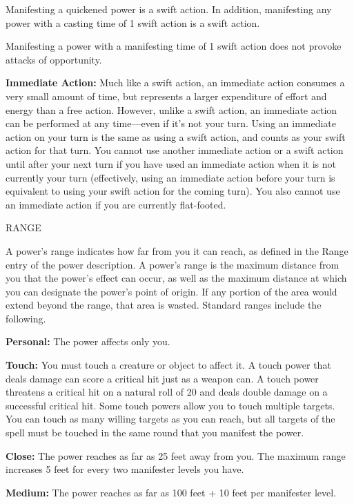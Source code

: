 \documentclass{article}
\begin{document}
Manifesting a quickened power is a swift action. In addition, manifesting any power 
with a casting time of 1 swift action is a swift action.

Manifesting a power with a manifesting time of 1 swift action does not provoke 
attacks of opportunity. 

\textbf{Immediate Action:} Much like a swift action, an immediate action consumes 
a very small amount of time, but represents a larger expenditure of effort and 
energy than a free action. However, unlike a swift action, an immediate action 
can be performed at any time---even if it's not your turn. Using an immediate action 
on your turn is the same as using a swift action, and counts as your swift action 
for that turn. You cannot use another immediate action or a swift action until 
after your next turn if you have used an immediate action when it is not currently 
your turn (effectively, using an immediate action before your turn is equivalent 
to using your swift action for the coming turn). You also cannot use an immediate 
action if you are currently flat-footed.

\vspace{12pt}
RANGE

A power's range indicates how far from you it can reach, as defined in the Range 
entry of the power description. A power's range is the maximum distance from you 
that the power's effect can occur, as well as the maximum distance at which you 
can designate the power's point of origin. If any portion of the area would extend 
beyond the range, that area is wasted. Standard ranges include the following.

\textbf{Personal: }The power affects only you.

\textbf{Touch:} You must touch a creature or object to affect it. A touch power 
that deals damage can score a critical hit just as a weapon can. A touch power 
threatens a critical hit on a natural roll of 20 and deals double damage on a successful 
critical hit. Some touch powers\textit{ }allow you to touch multiple targets. You 
can touch as many willing targets as you can reach, but all targets of the spell 
must be touched in the same round that you manifest the power.

\textbf{Close: }The power reaches as far as 25 feet away from you. The maximum 
range increases 5 feet for every two manifester levels you have.

\textbf{Medium: }The power reaches as far as 100 feet + 10 feet per manifester 
level.
\end{document}
